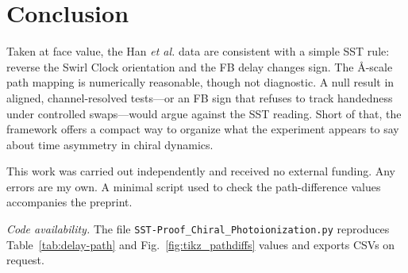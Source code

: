 \documentclass[reprint, aps, prl, longbibliography]{revtex4-2}
\begin{document}
\section{Conclusion}
Taken at face value, the Han \emph{et al.} data are consistent with a simple SST rule: reverse the Swirl Clock orientation and the FB delay changes sign. The Å-scale path mapping is numerically reasonable, though not diagnostic. A null result in aligned, channel-resolved tests—or an FB sign that refuses to track handedness under controlled swaps—would argue against the SST reading. Short of that, the framework offers a compact way to organize what the experiment appears to say about time asymmetry in chiral dynamics.

\begin{acknowledgments}
This work was carried out independently and received no external funding. Any errors are my own. A minimal script used to check the path-difference values accompanies the preprint.
\end{acknowledgments}

\noindent\textit{Code availability.} The file \texttt{SST-Proof\_Chiral\_Photoionization.py} reproduces Table~\ref{tab:delay-path} and Fig.~\ref{fig:tikz_pathdiffs} values and exports CSVs on request.




\end{document}
